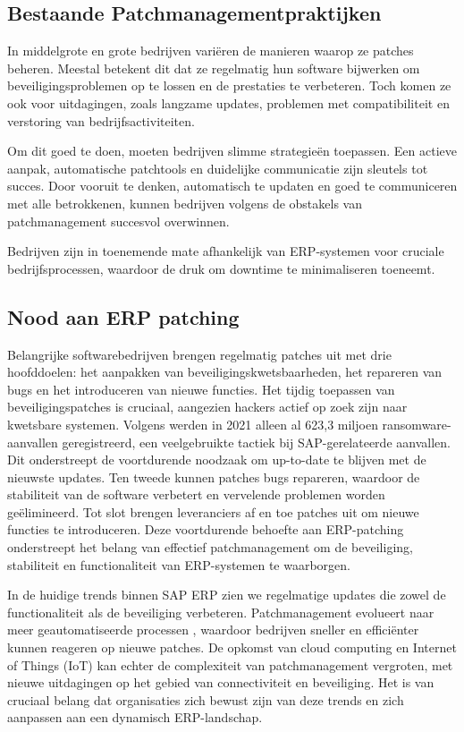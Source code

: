 \subsection{Bestaande Patchmanagementpraktijken}

In middelgrote en grote bedrijven variëren de manieren waarop ze patches beheren. Meestal betekent dit dat ze regelmatig hun software bijwerken om beveiligingsproblemen op te lossen en de prestaties te verbeteren. Toch komen ze ook voor uitdagingen, zoals langzame updates, problemen met compatibiliteit en verstoring van bedrijfsactiviteiten.

Om dit goed te doen, moeten bedrijven slimme strategieën toepassen. Een actieve aanpak, automatische patchtools en duidelijke communicatie zijn sleutels tot succes. Door vooruit te denken, automatisch te updaten en goed te communiceren met alle betrokkenen, kunnen bedrijven volgens \autocite{Firch2023} de obstakels van patchmanagement succesvol overwinnen. 

Bedrijven zijn in toenemende mate afhankelijk van ERP-systemen voor cruciale bedrijfsprocessen, waardoor de druk om downtime te minimaliseren toeneemt.
\subsection{Nood aan ERP patching }
Belangrijke softwarebedrijven brengen regelmatig patches uit met drie hoofddoelen: het aanpakken van beveiligingskwetsbaarheden, het repareren van bugs en het introduceren van nieuwe functies. Het tijdig toepassen van beveiligingspatches is cruciaal, aangezien hackers actief op zoek zijn naar kwetsbare systemen. Volgens \autocite{Griffiths2022} werden in 2021 alleen al 623,3 miljoen ransomware-aanvallen geregistreerd, een veelgebruikte tactiek bij SAP-gerelateerde aanvallen. Dit onderstreept de voortdurende noodzaak om up-to-date te blijven met de nieuwste updates. Ten tweede kunnen patches bugs repareren, waardoor de stabiliteit van de software verbetert en vervelende problemen worden geëlimineerd. Tot slot brengen leveranciers af en toe patches uit om nieuwe functies te introduceren. Deze voortdurende behoefte aan ERP-patching onderstreept het belang van effectief patchmanagement om de beveiliging, stabiliteit en functionaliteit van ERP-systemen te waarborgen.

In de huidige trends binnen SAP ERP zien we regelmatige updates die zowel de functionaliteit als de beveiliging verbeteren. Patchmanagement evolueert naar meer geautomatiseerde processen \autocite{Mukkamala2022}, waardoor bedrijven sneller en efficiënter kunnen reageren op nieuwe patches. De opkomst van cloud computing en Internet of Things (IoT) kan echter de complexiteit van patchmanagement vergroten, met nieuwe uitdagingen op het gebied van connectiviteit en beveiliging. Het is van cruciaal belang dat organisaties zich bewust zijn van deze trends en zich aanpassen aan een dynamisch ERP-landschap. 

